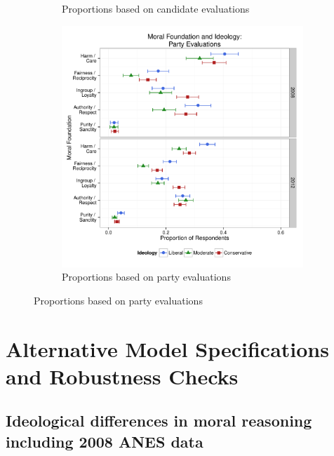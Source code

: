 \documentclass[12pt]{article}
\begin{document}
\begin{figure}[h]
\begin{subfigure}[t]{0.49\textwidth}
\caption{Proportions based on candidate evaluations}\label{fig:appC2cand}
  \end{subfigure}
  \begin{subfigure}[t]{0.49\textwidth}
    \includegraphics[scale=.4]{../calc/fig/appC3party.pdf}
\caption{Proportions based on party evaluations}\label{fig:appC3party}
  \end{subfigure}
\end{figure}


\clearpage
\section{Alternative Model Specifications and Robustness Checks}\label{app:robust}
\renewcommand\thefigure{\thesection.\arabic{figure}}
\renewcommand\thetable{\thesection.\arabic{table}}
\setcounter{figure}{0}
\setcounter{table}{0}


\subsection{Ideological differences in moral reasoning including 2008 ANES data}
\end{document}
